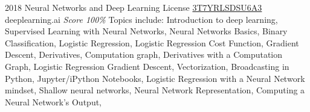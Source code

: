 \documentclass[11pt,a4paper]{moderncv}
\begin{document}
\cventry
    {2018}
    {Neural Networks and Deep Learning}
    {License
        \href{https://www.coursera.org/account/accomplishments/records/T7YRLSDSU6A}
        {3T7YRLSDSU6A3}
    }
    {deeplearning.ai}
    {\textit{Score 100\%}}
    {
        Topics include:                                                                                           %
            Introduction to deep learning,                                                                        %
            Supervised Learning with Neural Networks,                                                             %
            Neural Networks Basics,                                                                               %
            Binary Classification,                                                                                %
            Logistic Regression,                                                                                  %
            Logistic Regression Cost Function,                                                                    %
            Gradient Descent,                                                                                     %
            Derivatives,                                                                                          %
            Computation graph,                                                                                    %
            Derivatives with a Computation Graph,                                                                 %
            Logistic Regression Gradient Descent,                                                                 %
            Vectorization,                                                                                        %
            Broadcasting in Python,                                                                               %
            Jupyter/iPython Notebooks,                                                                            %
            Logistic Regression with a Neural Network mindset,                                                    %
            Shallow neural networks,                                                                              %
            Neural Network Representation,                                                                        %
            Computing a Neural Network's Output,                                                                  %
}
\end{document}
